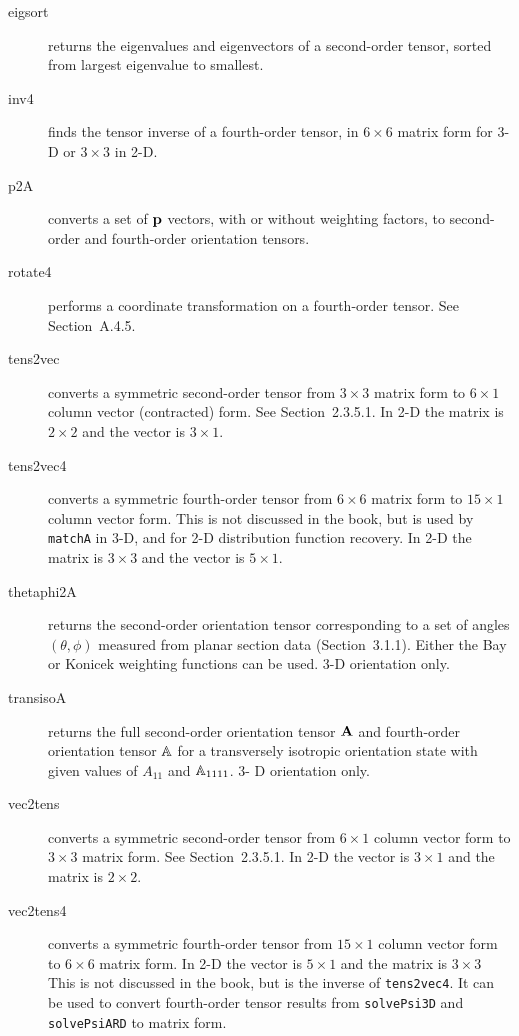 \documentclass[11pt]{article}
\begin{document}
\begin{description}

    \item[eigsort]{returns the eigenvalues and eigenvectors of a second-order tensor, sorted from largest eigenvalue to smallest.}

    \item[inv4]{finds the tensor inverse of a fourth-order tensor, in $6 \times 6$ matrix form for 3-D or $3 \times 3$ in 2-D.}

    \item[p2A]{converts a set of $\mathbf{p}$ vectors, with or without weighting factors, to second-order and fourth-order orientation tensors.}

    \item[rotate4]{performs a coordinate transformation on a fourth-order tensor.  See Section~A.4.5.}

    \item[tens2vec]{converts a symmetric second-order tensor from $3 \times 3$ matrix form to $6 \times 1$ column vector (contracted) form.  See Section~2.3.5.1.  In 2-D the matrix is $2 \times 2$ and the vector is $3 \times 1$.}

    \item[tens2vec4]{converts a symmetric fourth-order tensor from $6 \times 6$ matrix form to $15 \times 1$ column vector form.  This is not discussed in the book, but is used by \texttt{matchA} in 3-D, and for 2-D distribution function recovery.  In 2-D the matrix is $3 \times 3$ and the vector is $5 \times 1$.}

    \item[thetaphi2A]{returns the second-order orientation tensor corresponding to a set of angles $(\theta, \phi)$ measured from planar section data (Section~3.1.1).  Either the Bay or Konicek weighting functions can be used.  3-D orientation only.}

    \item[transisoA]{returns the full second-order orientation tensor $\mathbf{A}$ and fourth-order orientation tensor $\mathbb{A}$ for a transversely isotropic orientation state with given values of $A_{11}$ and $\mathbb{A}_{1111}$.  3- D orientation only.}

    \item[vec2tens]{converts a symmetric second-order tensor from $6 \times 1$ column vector form to $3 \times 3$ matrix form.  See Section~2.3.5.1.  In 2-D the vector is $3 \times 1$ and the matrix is $2 \times 2$.}

    \item[vec2tens4]{converts a symmetric fourth-order tensor from $15 \times 1$ column vector form to $6 \times 6$ matrix form.  In 2-D the vector is $5 \times 1$ and the matrix is $3 \times 3$  This is not discussed in the book, but is the inverse of \texttt{tens2vec4}.  It can be used to convert fourth-order tensor results from \texttt{solvePsi3D} and \texttt{solvePsiARD} to matrix form.}
    
\end{description}
\end{document}
